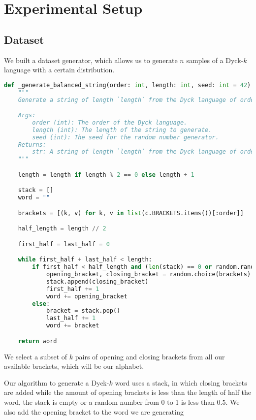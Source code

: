 \chapter{Experimental Setup}

\section{Dataset}

We built a dataset generator, which allows us to generate $n$ samples of a Dyck-$k$ language with a certain distribution.

\begin{lstlisting}[language=Python, caption=Generate balanced string, label=balanced_generator]
def _generate_balanced_string(order: int, length: int, seed: int = 42) -> str:
    """
    Generate a string of length `length` from the Dyck language of order `order`.

    Args:
        order (int): The order of the Dyck language.
        length (int): The length of the string to generate.
        seed (int): The seed for the random number generator.
    Returns:
        str: A string of length `length` from the Dyck language of order `order`.
    """

    length = length if length % 2 == 0 else length + 1

    stack = []
    word = ""

    brackets = [(k, v) for k, v in list(c.BRACKETS.items())[:order]]

    half_length = length // 2

    first_half = last_half = 0

    while first_half + last_half < length:
        if first_half < half_length and (len(stack) == 0 or random.random() < 0.5):
            opening_bracket, closing_bracket = random.choice(brackets)
            stack.append(closing_bracket)
            first_half += 1
            word += opening_bracket
        else:
            bracket = stack.pop()
            last_half += 1
            word += bracket

    return word
\end{lstlisting}

We select a subset of $k$ pairs of opening and closing brackets from all our available brackets, which will be our alphabet.

Our algorithm to generate a Dyck-$k$ word uses a stack, in which closing brackets are added while the amount of opening brackets is less than the length of half the word, the stack is empty or a random number from 0 to 1 is less than $0.5$. We also add the opening bracket to the word we are generating


